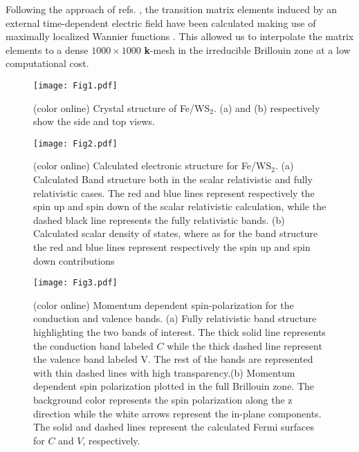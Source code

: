 \documentclass[aps,prb,showpacs,preprintnumbers,twocolumn,amsmath,amssymb]{revtex4-1}
\begin{document}
Following the approach of refs. , the transition matrix elements induced by an external time-dependent electric field have been calculated making use of maximally localized Wannier functions \cite{Wang2006,Lopez2012}. This allowed us to interpolate the matrix elements to a dense $1000\times1000$ \textbf{k}-mesh in the irreducible Brillouin zone at a low computational cost.
\begin{figure}[t]
\centering

\texttt{[image: Fig1.pdf]}
\caption{(color online) Crystal structure of Fe/WS$_{2}$. (a) and (b) respectively show the side and top views.}
\label{fig:Crystal-Structure}

\end{figure}


%
\begin{figure}[t]
\centering

\texttt{[image: Fig2.pdf]}
\caption{(color online) Calculated electronic structure for  Fe/WS$_{2}$. (a) Calculated Band structure both in the scalar relativistic and fully relativistic cases. The red and blue lines represent respectively the spin up and spin down of the scalar relativistic calculation, while the dashed black line represents the fully relativistic bands. (b) Calculated scalar density of states, where as for the band structure the red and blue lines represent respectively the spin up and spin down contributions}
\label{fig:electron-structure}

\end{figure}
 



\begin{figure*}[t]
\centering
\texttt{[image: Fig3.pdf]}
\caption{(color online) Momentum dependent spin-polarization for the conduction and valence bands. (a) Fully relativistic band structure highlighting the two bands of interest. The thick solid line represents the conduction band labeled $C$ while the thick dashed line represent the valence band labeled V. The rest of the bands are represented with thin dashed lines with high transparency.(b) Momentum dependent spin polarization plotted in the full Brillouin zone. The background color represents the spin polarization along the z direction while the white arrows represent the in-plane components. The solid and dashed lines represent the calculated Fermi surfaces for $C$ and $V$, respectively.}
\label{fig:Spin-pol}

\end{figure*}
\end{document}
